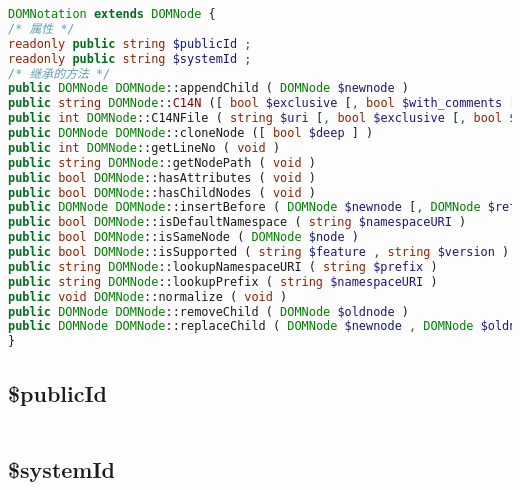 \begin{lstlisting}[language=PHP]
DOMNotation extends DOMNode {
/* 属性 */
readonly public string $publicId ;
readonly public string $systemId ;
/* 继承的方法 */
public DOMNode DOMNode::appendChild ( DOMNode $newnode )
public string DOMNode::C14N ([ bool $exclusive [, bool $with_comments [, array $xpath [, array $ns_prefixes ]]]] )
public int DOMNode::C14NFile ( string $uri [, bool $exclusive [, bool $with_comments [, array $xpath [, array $ns_prefixes ]]]] )
public DOMNode DOMNode::cloneNode ([ bool $deep ] )
public int DOMNode::getLineNo ( void )
public string DOMNode::getNodePath ( void )
public bool DOMNode::hasAttributes ( void )
public bool DOMNode::hasChildNodes ( void )
public DOMNode DOMNode::insertBefore ( DOMNode $newnode [, DOMNode $refnode ] )
public bool DOMNode::isDefaultNamespace ( string $namespaceURI )
public bool DOMNode::isSameNode ( DOMNode $node )
public bool DOMNode::isSupported ( string $feature , string $version )
public string DOMNode::lookupNamespaceURI ( string $prefix )
public string DOMNode::lookupPrefix ( string $namespaceURI )
public void DOMNode::normalize ( void )
public DOMNode DOMNode::removeChild ( DOMNode $oldnode )
public DOMNode DOMNode::replaceChild ( DOMNode $newnode , DOMNode $oldnode )
}
\end{lstlisting}

\subsection{\$publicId}


\begin{lstlisting}[language=PHP]

\end{lstlisting}

\subsection{\$systemId}


\begin{lstlisting}[language=PHP]

\end{lstlisting}


\begin{lstlisting}[language=PHP]

\end{lstlisting}


\begin{lstlisting}[language=PHP]

\end{lstlisting}


